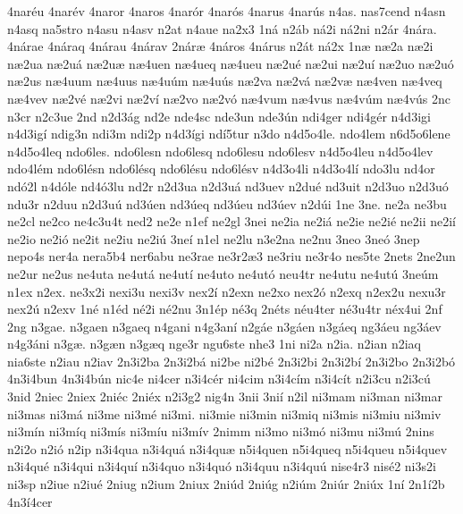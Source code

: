{4nar^^e9u
4nar^^e9v
4naror
4naros
4nar^^f3r
4nar^^f3s
4narus
4nar^^fas
n4as.
nas7cend
n4asn
n4asq
na5stro
n4asu
n4asv
n2at
n4aue
na2x3
1n^^e1
n2^^e1b
n^^e12i
n^^e12ni
n2^^e1r
4n^^e1ra.
4n^^e1rae
4n^^e1raq
4n^^e1rau
4n^^e1rav
2n^^e1r^^e6
4n^^e1ros
4n^^e1rus
n2^^e1t
n^^e12x
1n^^e6
n^^e62a
n^^e62i
n^^e62ua
n^^e62u^^e1
n^^e62u^^e6
n^^e64uen
n^^e64ueq
n^^e64ueu
n^^e62u^^e9
n^^e62ui
n^^e62u^^ed
n^^e62uo
n^^e62u^^f3
n^^e62us
n^^e64uum
n^^e64uus
n^^e64u^^fam
n^^e64u^^fas
n^^e62va
n^^e62v^^e1
n^^e62v^^e6
n^^e64ven
n^^e64veq
n^^e64vev
n^^e62v^^e9
n^^e62vi
n^^e62v^^ed
n^^e62vo
n^^e62v^^f3
n^^e64vum
n^^e64vus
n^^e64v^^fam
n^^e64v^^fas
2nc
n3cr
n2c3ue
2nd
n2d3^^e1g
nd2e
nde4sc
nde3un
nde3^^fan
ndi4ger
ndi4g^^e9r
n4d3igi
n4d3ig^^ed
ndig3n
ndi3m
ndi2p
n4d3^^edgi
nd^^ed5tur
n3do
n4d5o4le.
ndo4lem
n6d5o6lene
n4d5o4leq
ndo6les.
ndo6lesn
ndo6lesq
ndo6lesu
ndo6lesv
n4d5o4leu
n4d5o4lev
ndo4l^^e9m
ndo6l^^e9sn
ndo6l^^e9sq
ndo6l^^e9su
ndo6l^^e9sv
n4d3o4li
n4d3o4l^^ed
ndo3lu
nd4or
nd^^f32l
n4d^^f3le
nd4^^f33lu
nd2r
n2d3ua
n2d3u^^e1
nd3uev
n2du^^e9
nd3uit
n2d3uo
n2d3u^^f3
ndu3r
n2duu
n2d3u^^fa
nd3^^faen
nd3^^faeq
nd3^^faeu
nd3^^faev
n2d^^fai
1ne
3ne.
ne2a
ne3bu
ne2cl
ne2co
ne4c3u4t
ned2
ne2e
n1ef
ne2gl
3nei
ne2ia
ne2i^^e1
ne2ie
ne2i^^e9
ne2ii
ne2i^^ed
ne2io
ne2i^^f3
ne2it
ne2iu
ne2i^^fa
3ne^^ed
n1el
ne2lu
n3e2na
ne2nu
3neo
3ne^^f3
3nep
nepo4s
ner4a
nera5b4
ner6abu
ne3rae
ne3r2^^e63
ne3riu
ne3r4o
nes5te
2nets
2ne2un
ne2ur
ne2us
ne4uta
ne4ut^^e1
ne4ut^^ed
ne4uto
ne4ut^^f3
neu4tr
ne4utu
ne4ut^^fa
3ne^^fam
n1ex
n2ex.
ne3x2i
nexi3u
nexi3v
nex2^^ed
n2exn
ne2xo
nex2^^f3
n2exq
n2ex2u
nexu3r
nex2^^fa
n2exv
1n^^e9
n1^^e9d
n^^e92i
n^^e92nu
3n1^^e9p
n^^e93q
2n^^e9ts
n^^e9u4ter
n^^e93u4tr
n^^e9x4ui
2nf
2ng
n3gae.
n3gaen
n3gaeq
n4gani
n4g3an^^ed
n2g^^e1e
n3g^^e1en
n3g^^e1eq
ng3^^e1eu
ng3^^e1ev
n4g3^^e1ni
n3g^^e6.
n3g^^e6n
n3g^^e6q
nge3r
ngu6ste
nhe3
1ni
ni2a
n2ia.
n2ian
n2iaq
nia6ste
n2iau
n2iav
2n3i2ba
2n3i2b^^e1
ni2be
ni2b^^e9
2n3i2bi
2n3i2b^^ed
2n3i2bo
2n3i2b^^f3
4n3i4bun
4n3i4b^^fan
nic4e
ni4cer
n3i4c^^e9r
ni4cim
n3i4c^^edm
n3i4c^^edt
n2i3cu
n2i3c^^fa
3nid
2niec
2niex
2ni^^e9c
2ni^^e9x
n2i3g2
nig4n
3nii
3ni^^ed
n2il
ni3mam
ni3man
ni3mar
ni3mas
ni3m^^e1
ni3me
ni3m^^e9
ni3mi.
ni3mie
ni3min
ni3miq
ni3mis
ni3miu
ni3miv
ni3m^^edn
ni3m^^edq
ni3m^^eds
ni3m^^edu
ni3m^^edv
2nimm
ni3mo
ni3m^^f3
ni3mu
ni3m^^fa
2nins
n2i2o
n2i^^f3
n2ip
n3i4qua
n3i4qu^^e1
n3i4qu^^e6
n5i4quen
n5i4queq
n5i4queu
n5i4quev
n3i4qu^^e9
n3i4qui
n3i4qu^^ed
n3i4quo
n3i4qu^^f3
n3i4quu
n3i4qu^^fa
nise4r3
nis^^e92
ni3s2i
ni3sp
n2iue
n2iu^^e9
2niug
n2ium
2niux
2ni^^fad
2ni^^fag
n2i^^fam
2ni^^far
2ni^^fax
1n^^ed
2n1^^ed2b
4n3^^ed4cer
}
